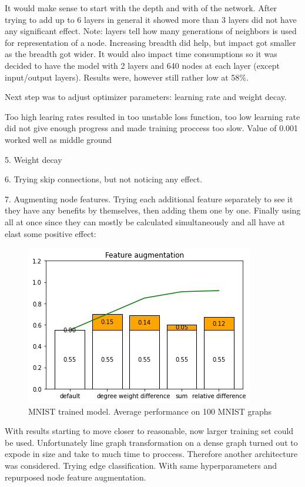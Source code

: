 It would make sense to start with the depth and with of the network. After trying to add up to 6 layers in general it showed more than 3 layers did not have any significant effect. Note: layers tell how many generations of neighbors is used for representation of a node. Increasing breadth did help, but impact got smaller as the breadth got wider. It would also impact time consumptions so it was decided to have the model with 2 layers and 640 nodes at each layer (except input/output layers). Results were, however still rather low at  58\%.

Next step was to adjust optimizer parameters: learning rate and weight decay. 

Too high learing rates resulted in too unstable loss function, too low learning rate did not give enough progress and made training proccess too slow. Value of 0.001 worked well as middle ground

5. Weight decay

6. Trying skip connections, but not noticing any effect.

7. Augmenting node features. Trying each additional feature separately to see it they have any benefits by themselves, then adding them one by one. Finally using all at once since they can mostly be calculated simultaneously and all have at elast some positive effect:

\begin{figure}[H]
    \centering
    \includegraphics[scale=1.0]{figures/FeatureAugmentationLine}
    \caption{MNIST trained model. Average performance on 100 MNIST graphs}
    \label{Feature Augmentation Effect}
\end{figure}


With results starting to move closer to reasonable, now larger training set could be used. Unfortunately line graph transformation on a dense graph turned out to expode in size and take to much time to proccess. Therefore another architecture was considered. Trying edge classification. With same hyperparameters and repurposed node feature augmentation.
 
